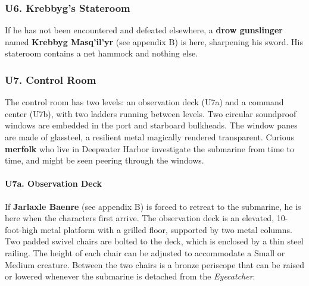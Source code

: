 \documentclass[10pt,a4paper,twoside,twocolumn,openany,nodeprecatedcode]{dndbook}
\begin{document}
\subsubsection{U6. Krebbyg's Stateroom}
If he has not been encountered and defeated elsewhere, a \textbf{drow gunslinger} named \textbf{Krebbyg Masq'il'yr} (see appendix B) is here, sharpening his sword. His stateroom contains a net hammock and nothing else.
\subsubsection{U7. Control Room}
The control room has two levels: an observation deck (U7a) and a command center (U7b), with two ladders running between levels. Two circular soundproof windows are embedded in the port and starboard bulkheads. The window panes are made of glassteel, a resilient metal magically rendered transparent. Curious \textbf{merfolk} who live in Deepwater Harbor investigate the submarine from time to time, and might be seen peering through the windows.
\paragraph{U7a. Observation Deck}
If \textbf{Jarlaxle Baenre} (see appendix B) is forced to retreat to the submarine, he is here when the characters first arrive. The observation deck is an elevated, 10-foot-high metal platform with a grilled floor, supported by two metal columns. Two padded swivel chairs are bolted to the deck, which is enclosed by a thin steel railing. The height of each chair can be adjusted to accommodate a Small or Medium creature. Between the two chairs is a bronze periscope that can be raised or lowered whenever the submarine is detached from the \textit{Eyecatcher}.
\end{document}
